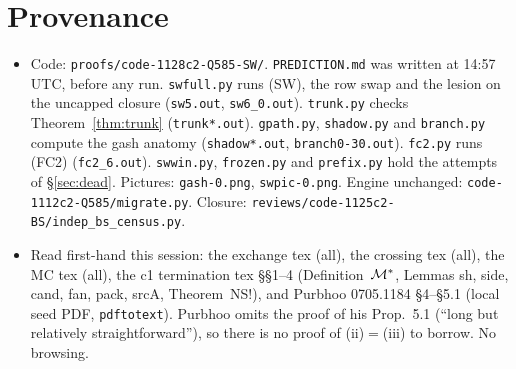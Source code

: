 \documentclass[11pt]{article}
\theoremstyle{definition}\newtheorem{definition}[theorem]{Definition}\newtheorem{remark}[theorem]{Remark}
\begin{document}
\section*{Provenance}
\begin{itemize}
\item Code: \texttt{proofs/code-1128c2-Q585-SW/}. \texttt{PREDICTION.md} was written at 14:57 UTC, before any run. \texttt{swfull.py}
runs (SW), the row swap and the lesion on the uncapped closure (\texttt{sw5.out}, \texttt{sw6\_0.out}). \texttt{trunk.py} checks
Theorem~\ref{thm:trunk} (\texttt{trunk*.out}). \texttt{gpath.py}, \texttt{shadow.py} and \texttt{branch.py} compute the gash anatomy
(\texttt{shadow*.out}, \texttt{branch0-30.out}). \texttt{fc2.py} runs (FC2) (\texttt{fc2\_6.out}). \texttt{swwin.py}, \texttt{frozen.py}
and \texttt{prefix.py} hold the attempts of \S\ref{sec:dead}. Pictures: \texttt{gash-0.png}, \texttt{swpic-0.png}. Engine unchanged:
\texttt{code-1112c2-Q585/migrate.py}. Closure: \texttt{reviews/code-1125c2-BS/indep\_bs\_census.py}.
\item Read first-hand this session: the exchange tex (all), the crossing tex (all), the MC tex (all), the c1 termination tex
\S\S1--4 (Definition~$\mathcal M^*$, Lemmas sh, side, cand, fan, pack, srcA, Theorem~NS!), and Purbhoo 0705.1184 \S4--\S5.1 (local seed PDF,
\texttt{pdftotext}). Purbhoo omits the proof of his Prop.~5.1 (``long but relatively straightforward''), so there is no proof of
(ii)$=$(iii) to borrow. No browsing.
\end{itemize}
\end{document}
